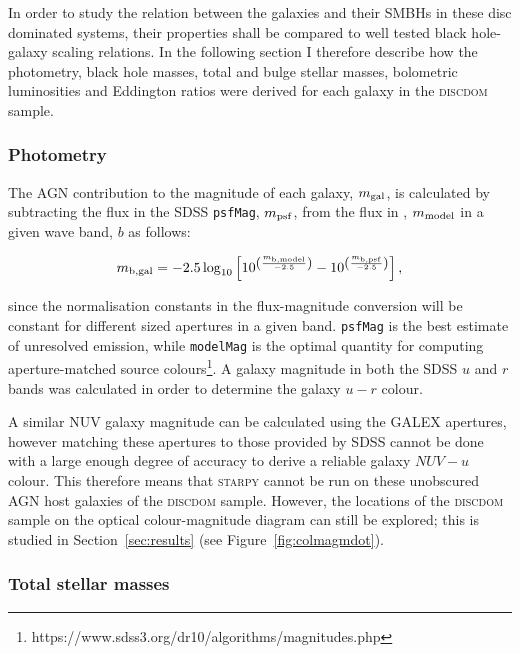 In order to study the relation between the galaxies and their SMBHs in these disc dominated systems, their properties shall be compared to well tested black hole-galaxy scaling relations. In the following section I therefore describe how the photometry, black hole masses, total and bulge stellar masses, bolometric luminosities and Eddington ratios were derived for each galaxy in the \textsc{discdom} sample. 

\subsubsection{Photometry}\label{sec:photo}

The AGN contribution to the magnitude of each galaxy, $m_{\rm{gal}}$, is calculated by subtracting the flux in the SDSS {\tt psfMag}, $m_{\rm{psf}}$, from the flux in {}, $m_{\rm{model}}$ in a given wave band, $b$ as follows:

\begin{equation}\label{galmag}
m_{\rm{b, gal}} = -2.5 \log_{10} \left[ 10^{\left(\frac{m_{\rm{b, model}}}{-2.5}\right)} - 10^{\left(\frac{m_{\rm{b, psf}}}{-2.5}\right)} \right],
\end{equation}

since the normalisation constants in the flux-magnitude conversion will be constant for different sized apertures in a given band. {\tt psfMag} is the best estimate of unresolved emission, while {\tt modelMag} is the optimal quantity for computing aperture-matched source colours\footnote{https://www.sdss3.org/dr10/algorithms/magnitudes.php}. A galaxy magnitude in both the SDSS $u$ and $r$ bands was calculated in order to determine the galaxy $u-r$ colour. 

A similar NUV galaxy magnitude can be calculated using the GALEX apertures, however matching these apertures to those provided by SDSS cannot be done with a large enough degree of accuracy to derive a reliable galaxy $NUV-u$ colour. This therefore means that \textsc{starpy} cannot be run on these unobscured AGN host galaxies of the \textsc{discdom} sample. However, the locations of the \textsc{discdom} sample on the optical colour-magnitude diagram can still be explored; this is studied in Section~\ref{sec:results} (see Figure~\ref{fig:colmagmdot}). 

\subsubsection{Total stellar masses}\label{sec:galmass}

